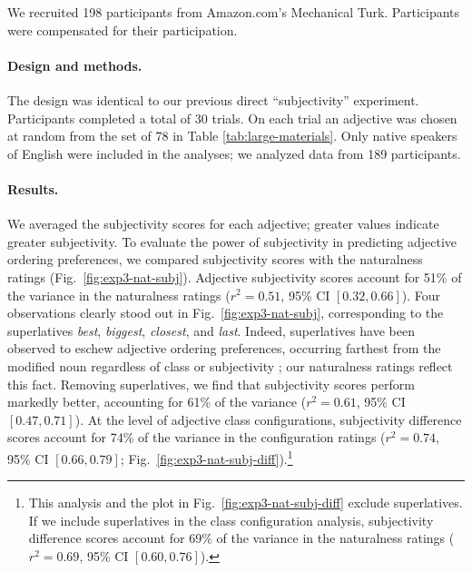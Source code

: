 \documentclass[12pt]{article}
\begin{document}
We recruited 198 participants from Amazon.com's Mechanical Turk. Participants were compensated for their participation.

\paragraph{Design and methods.}

The design was identical to our previous direct ``subjectivity'' experiment. 
Participants completed a total of 30 trials. On each trial an adjective was chosen at random from the set of 78 in Table \ref{tab:large-materials}.  Only native speakers of English 
were included in the analyses; we analyzed data from 189 participants.

\paragraph{Results.}



We averaged the subjectivity scores for each adjective; greater values indicate greater subjectivity.
To evaluate the power of subjectivity in predicting adjective ordering preferences, we compared subjectivity scores with the naturalness ratings (Fig.~\ref{fig:exp3-nat-subj}). Adjective subjectivity scores account for 51\% of the variance in the naturalness ratings ($r^2=0.51$, 95\% CI $[0.32, 0.66]$). Four observations clearly stood out in Fig.~\ref{fig:exp3-nat-subj}, corresponding to the superlatives \emph{best}, \emph{biggest}, \emph{closest}, and \emph{last}. Indeed, superlatives have been observed to eschew adjective ordering preferences, occurring farthest from the modified noun regardless of class or subjectivity \citep{dixon1982}; our naturalness ratings reflect this fact. Removing superlatives, we find that subjectivity scores perform markedly better, accounting for 61\% of the variance ($r^2=0.61$, 95\% CI $[0.47, 0.71]$). At the level of adjective class configurations, subjectivity difference scores account for 74\% of the variance in the configuration ratings ($r^2=0.74$, 95\% CI $[0.66, 0.79]$; Fig.~\ref{fig:exp3-nat-subj-diff}).\footnote{This analysis and the plot in Fig.~\ref{fig:exp3-nat-subj-diff} exclude superlatives. If we include superlatives in the class configuration analysis, subjectivity difference scores account for 69\% of the variance in the naturalness ratings ($r^2=0.69$, 95\% CI $[0.60,  0.76]$).}
\end{document}
